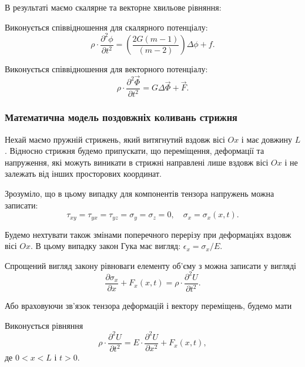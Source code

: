 В результаті маємо  скалярне та векторне хвильове рівняння:
\begin{th_equation}
	Виконується співвідношення для скалярного потенціалу:
	\begin{equation}
		\rho \cdot \frac{\partial^2 \phi}{\partial t^2} = \left( \frac{2 G (m - 1)}{(m - 2)} \right) \Delta \phi + f.
	\end{equation}
\end{th_equation}

\begin{th_equation}
	Виконується співвідношення для векторного потенціалу:
	\begin{equation}
		\rho \cdot \frac{\partial^2 \vec \Phi}{\partial t^2} = G \Delta  \vec \Phi + \vec F.
	\end{equation}
\end{th_equation}

\subsubsection{Математична модель поздовжніх коливань стрижня}

Нехай маємо пружній стрижень, який витягнутий вздовж вісі $Ox$ і має довжину $L$. Відносно стрижня будемо припускати, що переміщення, деформації та напруження, які можуть виникати в стрижні направлені лише вздовж вісі $Ox$ і не залежать від інших просторових координат. \medskip

Зрозуміло, що в цьому випадку для компонентів тензора напружень можна записати: 
\begin{equation}
	\tau_{x y} = \tau_{y x} = \tau_{y z} = \sigma_y = \sigma_z = 0, \quad \sigma_x = \sigma_x(x, t).
\end{equation}

Будемо нехтувати також змінами поперечного перерізу при деформаціях вздовж вісі $Ox$. В цьому випадку закон Гука має вигляд: $\epsilon_x = \sigma_x / E$. \medskip

Спрощений вигляд закону рівноваги елементу об'єму з можна записати у вигляді
\begin{equation}
	\frac{\partial \sigma_x}{\partial x} + F_x(x, t) = \rho \cdot \frac{\partial^2 U}{\partial t^2}.
\end{equation}

Або враховуючи зв'язок тензора деформацій і вектору переміщень, будемо мати 
\begin{th_equation}
	Виконується рівняння
	\begin{equation}
		\rho \cdot \frac{\partial^2 U}{\partial t^2} = E \cdot \frac{\partial^2 U}{\partial x^2} + F_x(x, t),
	\end{equation}
	де $0 < x < L$ і $t > 0$.
\end{th_equation}

